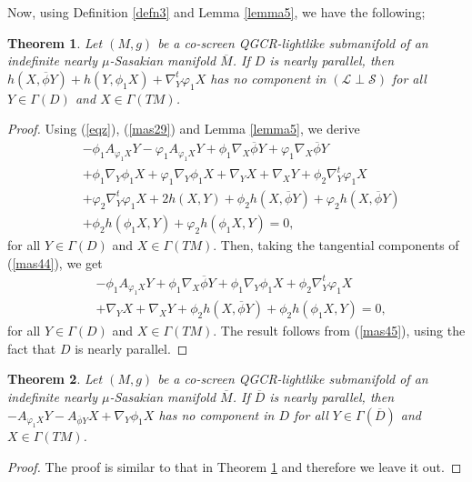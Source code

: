 \documentclass[reqno, 12pt]{amsart}
\numberwithin{equation}{section}
\newtheorem{theorem}{Theorem}[section]
\begin{document}
Now, using Definition \ref{defn3} and Lemma \ref{lemma5}, we have the following;
\begin{theorem}\label{theorem2}
  Let $(M,g)$ be a co-screen QGCR-lightlike submanifold of an indefinite nearly $\mu$-Sasakian manifold $\overline{M}$. If  $D$ is nearly parallel, then $h(X,\overline{\phi}Y)+h(Y,\phi_{1}X)+\nabla^{t}_{Y}\varphi_{1}X$ has no component in $(\mathcal{L}\perp\mathcal{S})$ for all $Y\in\Gamma(D)$ and $X\in\Gamma(TM)$.
\end{theorem}
\begin{proof}
 Using (\ref{eqz}), (\ref{mas29}) and Lemma \ref{lemma5}, we derive
 \begin{align}\label{mas44}
 &-\phi_{1}A_{\varphi_{1}X}Y-\varphi_{1}A_{\varphi_{1}X}Y+\phi_{1}\nabla_{X}\overline{\phi}Y+\varphi_{1}\nabla_{X}\overline{\phi}Y\nonumber\\
 &+\phi_{1}\nabla_{Y}\phi_{1}X+\varphi_{1}\nabla_{Y}\phi_{1}X+\nabla_{Y}X+\nabla_{X}Y+\phi_{2}\nabla_{Y}^{t}\varphi_{1}X\nonumber\\
 &+\varphi_{2}\nabla_{Y}^{t}\varphi_{1}X+2h(X,Y)+\phi_{2}h(X,\overline{\phi}Y)+\varphi_{2}h(X,\overline{\phi}Y)\nonumber\\
 &+\phi_{2}h(\phi_{1}X,Y)+\varphi_{2}h(\phi_{1}X,Y)=0,
 \end{align}
for all $Y\in\Gamma(D)$ and $X\in\Gamma(TM)$. Then, taking the tangential components of (\ref{mas44}), we get 
\begin{align}\label{mas45}
 &-\phi_{1}A_{\varphi_{1}X}Y+\phi_{1}\nabla_{X}\overline{\phi}Y+\phi_{1}\nabla_{Y}\phi_{1}X+\phi_{2}\nabla_{Y}^{t}\varphi_{1}X\nonumber\\
 &+\nabla_{Y}X+\nabla_{X}Y+\phi_{2}h(X,\overline{\phi}Y)+\phi_{2}h(\phi_{1}X,Y)=0,
\end{align}
for all $Y\in\Gamma(D)$ and $X\in\Gamma(TM)$. The result follows from (\ref{mas45}), using the fact that $D$ is nearly parallel.
\end{proof}
\begin{theorem}
  Let $(M,g)$ be a co-screen QGCR-lightlike submanifold of an indefinite nearly $\mu$-Sasakian manifold $\overline{M}$. If  $\overline{D}$ is nearly parallel, then $-A_{\varphi_{1}X}Y-A_{\overline{\phi}Y}X+\nabla_{Y}\phi_{1}X$ has no component in $D$ for all $Y\in\Gamma(\overline{D})$ and $X\in\Gamma(TM)$.
\end{theorem}
\begin{proof}
 The proof is similar to that in Theorem \ref{theorem2} and therefore we leave it out.
\end{proof}
\end{document}
